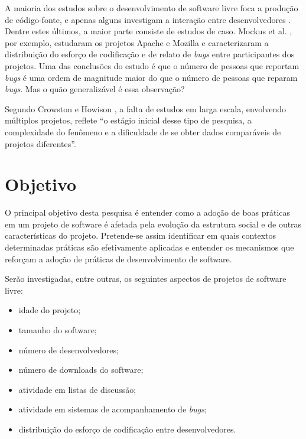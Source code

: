 \documentclass{article}
\begin{document}
A maioria dos estudos sobre o desenvolvimento de software livre foca a produção
de código-fonte, e apenas alguns investigam a interação entre desenvolvedores
\cite{crowston2005}. Dentre estes últimos, a maior parte consiste de estudos de
caso. Mockus et al. \cite{mockus2002}, por exemplo, estudaram os projetos Apache
e Mozilla e caracterizaram a distribuição do esforço de codificação e de relato
de \emph{bugs} entre participantes dos projetos. Uma das conclusões do estudo é
que o número de pessoas que reportam \emph{bugs} é uma ordem de magnitude maior
do que o número de pessoas que reparam \emph{bugs}. Mas o quão generalizável é
essa observação?

Segundo Crowston e Howison \cite{crowston2005}, a falta de estudos em larga
escala, envolvendo múltiplos projetos, reflete ``o estágio inicial desse tipo de
pesquisa, a complexidade do fenômeno e a dificuldade de se obter dados
comparáveis de projetos diferentes''.



\section{Objetivo}

O principal objetivo desta pesquisa é entender como a adoção de boas práticas em
um projeto de software é afetada pela evolução da estrutura social e de outras
características do projeto. Pretende-se assim identificar em quais contextos
determinadas práticas são efetivamente aplicadas e entender os mecanismos que
reforçam a adoção de práticas de desenvolvimento de software.

Serão investigadas, entre outras, os seguintes aspectos de projetos de software
livre:
\begin{itemize}
  \item idade do projeto;
  \item tamanho do software;
  \item número de desenvolvedores;
  \item número de downloads do software;
  \item atividade em listas de discussão;
  \item atividade em sistemas de acompanhamento de \emph{bugs};
  \item distribuição do esforço de codificação entre desenvolvedores.
\end{itemize}
\end{document}
